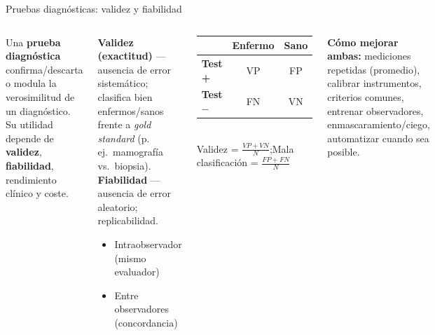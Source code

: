 \documentclass[aspectratio=169,8pt]{beamer}
\begin{document}
\begin{frame}{Pruebas diagn\'osticas: validez y fiabilidad}
  \begin{columns}[T,onlytextwidth]
      \small Una \textbf{prueba diagn\'ostica} confirma/descarta o modula la verosimilitud de un diagn\'ostico. Su utilidad depende de \textbf{validez}, \textbf{fiabilidad}, rendimiento cl\'inico y coste.\\[4pt]
      \begin{tcolorbox}[infobox]
        \footnotesize
        \textbf{Validez (exactitud)} --- ausencia de error sistem\'atico; clasifica bien enfermos/sanos frente a \emph{gold standard} (p.\,ej.\ mamograf\'ia vs.\ biopsia).\\[2pt]
        \textbf{Fiabilidad} --- ausencia de error aleatorio; replicabilidad.
        \begin{itemize}
          \item Intraobservador (mismo evaluador)
          \item Entre observadores (concordancia)
        \end{itemize}
      \end{tcolorbox}
      \begin{tcolorbox}[formulabox,title=Tabla $2\times2$]
        \centering\small
        \begin{tabular}{lcc}
          \toprule
          & \textbf{Enfermo} & \textbf{Sano}\\
          \midrule
          \textbf{Test +} & VP & FP\\
          \textbf{Test $-$} & FN & VN\\
          \bottomrule
        \end{tabular}\\[4pt]
        {\scriptsize Validez = $\tfrac{VP+VN}{N}$;\quad Mala clasificaci\'on = $\tfrac{FP+FN}{N}$}
      \end{tcolorbox}
      \begin{tcolorbox}[amberbox]
        \scriptsize\raggedright\textbf{C\'omo mejorar ambas:} mediciones repetidas (promedio), calibrar instrumentos, criterios comunes, entrenar observadores, enmascaramiento/ciego, automatizar cuando sea posible.\par
      \end{tcolorbox}
    \end{columns}
\end{frame}
\end{document}

